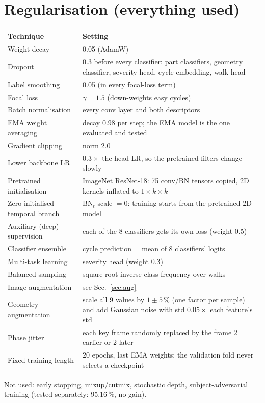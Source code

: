 \documentclass[10pt,a4paper]{article}
\begin{document}
\section{Regularisation (everything used)}
\begin{center}
\begin{tabularx}{\textwidth}{@{}lL@{}}
\toprule
Technique & Setting \\
\midrule
Weight decay & 0.05 (AdamW) \\
Dropout & 0.3 before every classifier: part classifiers, geometry classifier, severity head,
  cycle embedding, walk head \\
Label smoothing & 0.05 (in every focal-loss term) \\
Focal loss & $\gamma = 1.5$ (down-weights easy cycles) \\
Batch normalisation & every conv layer and both descriptors \\
EMA weight averaging & decay 0.98 per step; the EMA model is the one evaluated and tested \\
Gradient clipping & norm 2.0 \\
Lower backbone LR & $0.3\times$ the head LR, so the pretrained filters change slowly \\
Pretrained initialisation & ImageNet ResNet-18: 75 conv/BN tensors copied, 2D kernels inflated to $1\times k\times k$ \\
Zero-initialised temporal branch & $\mathrm{BN}_t$ scale $= 0$: training starts from the pretrained 2D model \\
Auxiliary (deep) supervision & each of the 8 classifiers gets its own loss (weight 0.5) \\
Classifier ensemble & cycle prediction = mean of 8 classifiers' logits \\
Multi-task learning & severity head (weight 0.3) \\
Balanced sampling & square-root inverse class frequency over walks \\
Image augmentation & see Sec.~\ref{sec:aug} \\
Geometry augmentation & scale all 9 values by $1 \pm 5\,\%$ (one factor per sample) and add Gaussian noise
  with std $0.05\times$ each feature's std \\
Phase jitter & each key frame randomly replaced by the frame 2 earlier or 2 later \\
Fixed training length & 20 epochs, last EMA weights; the validation fold never selects a checkpoint \\
\bottomrule
\end{tabularx}
\end{center}
Not used: early stopping, mixup/cutmix, stochastic depth, subject-adversarial training
(tested separately: 95.16\,\%, no gain).
\end{document}
